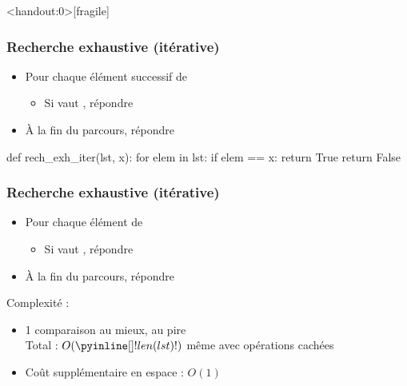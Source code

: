 \documentclass[12pt]{linfo-beamer}
\begin{document}
\begin{frame}<handout:0>[fragile]
  \frametitle{Recherche exhaustive (itérative)}

  \begin{itemize}
  \item Pour chaque élément successif  de 
    \begin{itemize}
    \item Si  vaut , répondre 
    \end{itemize}
  \item À la fin du parcours, répondre 
  \end{itemize}

  \vfill

\begin{pyframe}{}
def rech_exh_iter(lst, x):
    for elem in lst:
        if elem == x:
            return True
    return False
\end{pyframe}
\end{frame}


\begin{frame}[fragile]
  \frametitle{Recherche exhaustive (itérative)}

  \begin{itemize}
  \item Pour chaque élément  de 
    \begin{itemize}
    \item Si  vaut , répondre 
    \end{itemize}
  \item À la fin du parcours, répondre 
  \end{itemize}

  \vfill

 Complexité :
\begin{itemize}
\item 1 comparaison au mieux,  au pire\\
  Total : $O(\code{len(lst)})$ même avec opérations cachées
\item Coût supplémentaire en espace : $O(1)$
\end{itemize}
\end{frame}
\end{document}
